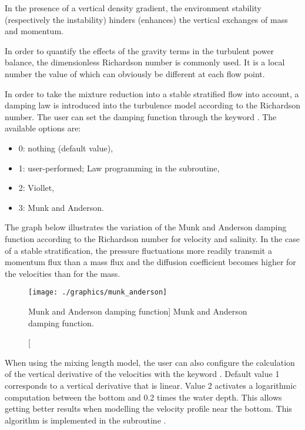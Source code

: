 In the presence of a vertical density gradient, the environment stability
(respectively the instability) hinders (enhances) the vertical exchanges of
mass and momentum.

In order to quantify the effects of the gravity terms in the turbulent power
balance, the dimensionless Richardson number is commonly used. It is a local
number the value of which can obviously be different at each flow point.

In order to take the mixture reduction into a stable stratified flow into
account, a damping law is introduced into the turbulence model according to the
Richardson number. The user can set the damping function through the keyword
. The available options are:

\begin{itemize}
\item  0: nothing (default value),

\item  1: user-performed; Law programming in the  subroutine,

\item  2: Viollet,

\item  3: Munk and Anderson.
\end{itemize}

The graph below illustrates the variation of the Munk and Anderson damping
function according to the Richardson number for velocity and salinity. In the
case of a stable stratification, the pressure fluctuations more readily
transmit a momentum flux than a mass flux and the diffusion coefficient becomes
higher for the velocities than for the mass.

\begin{figure}[H]%
\begin{center}
%
  \texttt{[image: ./graphics/munk\_anderson]}
%
\end{center}
\caption
[Munk and Anderson damping function]
{Munk and Anderson damping function.}
\label{fig:munk_anderson}
\end{figure}

When using the mixing length model, the user can also configure the calculation
of the vertical derivative of the velocities with the keyword . Default value 1 corresponds
to a vertical derivative that is linear. Value 2 activates a logarithmic
computation between the bottom and 0.2 times the water depth. This allows
getting better results when modelling the velocity profile near the bottom.
This algorithm is implemented in the subroutine .


